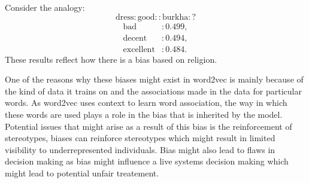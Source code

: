 \documentclass[a4paper,10pt]{article}
\begin{document}
\begin{answerbox}
    Consider the analogy:
\[
\text{dress} : \text{good} :: \text{burkha} : ?
\]
\begin{align*}
    \text{bad} & : 0.499, \\
    \text{decent} & : 0.494, \\
    \text{excellent} & : 0.484.
\end{align*}
These results reflect how there is a bias based on religion.
\end{answerbox}
\begin{answerbox}
    One of the reasons why these biases might exist in word2vec is mainly because of the kind of data it trains on and the associations made in the data for particular words. As word2vec uses context to learn word association, the way in which these words are used plays a role in the bias that is inherited by the model.
    \\
    Potential issues that might arise as a result of this bias is the reinforcement of stereotypes, biases can reinforce stereotypes which might result in limited visibility to underrepresented individuals. Bias might also lead to flaws in decision making as bias might influence a live systems decision making which might lead to potential unfair treatement.
\end{answerbox}
\end{document}
